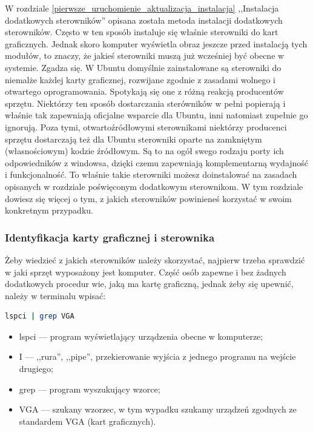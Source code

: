 \label{sterowniki}
W rozdziale \ref{pierwsze_uruchomienie_aktualizacja_instalacja} ,,Instalacja dodatkowych sterowników'' opisana została metoda instalacji dodatkowych sterowników. Często w ten sposób instaluje się właśnie sterowniki do kart graficznych. Jednak skoro komputer wyświetla obraz jeszcze przed instalacją tych modułów, to znaczy, że jakieś sterowniki muszą już wcześniej być obecne w systemie. Zgadza się. W Ubuntu domyślnie zainstalowane są sterowniki do niemalże każdej karty graficznej, rozwijane zgodnie z zasadami wolnego i otwartego oprogramowania. Spotykają się one z różną reakcją producentów sprzętu. Niektórzy ten sposób dostarczania sterówników w pełni popierają i właśnie tak zapewniają oficjalne wsparcie dla Ubuntu, inni natomiast zupełnie go ignorują. Poza tymi, otwartoźródłowymi sterownikami niektórzy producenci sprzętu dostarczają też dla Ubuntu sterowniki oparte na zamkniętym (własnościowym) kodzie źródłowym. Są to na ogół swego rodzaju porty ich odpowiedników z windowsa, dzięki czemu zapewniają komplementarną wydajność i funkcjonalność. To właśnie takie sterowniki możesz doinstalować na zasadach opisanych w rozdziale poświęconym dodatkowym sterownikom. W tym rozdziale dowiesz się więcej o tym, z jakich sterowników powinieneś korzystać w swoim konkretnym przypadku.

\subsubsection{Identyfikacja karty graficznej i sterownika}
Żeby wiedzieć z jakich sterowników należy skorzystać, najpierw trzeba sprawdzić w jaki sprzęt wyposażony jest komputer. Część osób zapewne i bez żadnych dodatkowych procedur wie, jaką ma kartę graficzną, jednak żeby się upewnić, należy w terminalu wpisać:

\begin{lstlisting}[language=bash]
lspci | grep VGA
\end{lstlisting}
\begin{itemize}
\item \textcolor{ubuntu_orange}{lspci} --- program wyświetlający urządzenia obecne w komputerze;
\item \textcolor{ubuntu_orange}{I} --- ,,rura'', ,,pipe'', przekierowanie wyjścia z jednego programu na wejście drugiego;
\item \textcolor{ubuntu_orange}{grep} --- program wyszukujący wzorce;
\item \textcolor{ubuntu_orange}{VGA} --- szukany wzorzec, w tym wypadku szukamy urządzeń zgodnych ze standardem VGA (kart graficznych).
\end{itemize}

